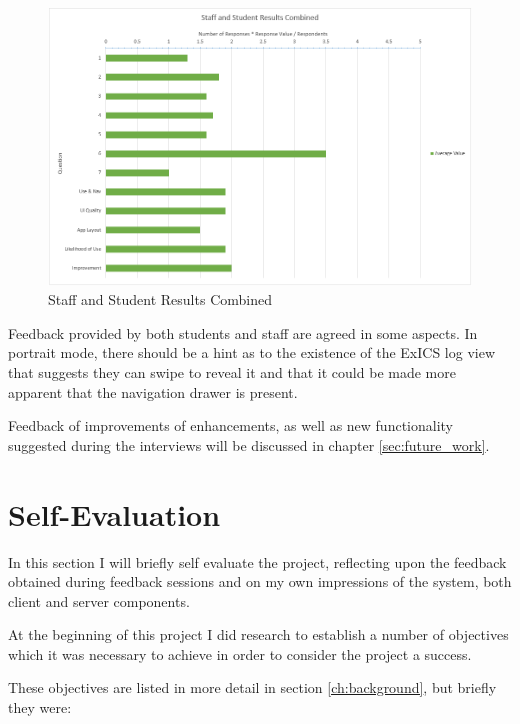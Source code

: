 \begin{figure}[!htbp]
	\centering
	\includegraphics[width=\textwidth]{"evaluation/graphs/mixed_responses"}
	\caption{Staff and Student Results Combined}
	\label{fig:mixed_responses}
\end{figure}

Feedback provided by both students and staff are agreed in some aspects.  In portrait mode, there should be a hint as to the existence of the ExICS log view that suggests they can swipe to reveal it and that it could be made more apparent that the navigation drawer is present.

Feedback of improvements of enhancements, as well as new functionality suggested during the interviews will be discussed in chapter \ref{sec:future_work}.

\FloatBarrier

\section{Self-Evaluation}

In this section I will briefly self evaluate the project, reflecting upon the feedback obtained during feedback sessions and on my own impressions of the system, both client and server components.

At the beginning of this project I did research to establish a number of objectives which it was necessary to achieve in order to consider the project a success.

These objectives are listed in more detail in section \ref{ch:background}, but briefly they were:

